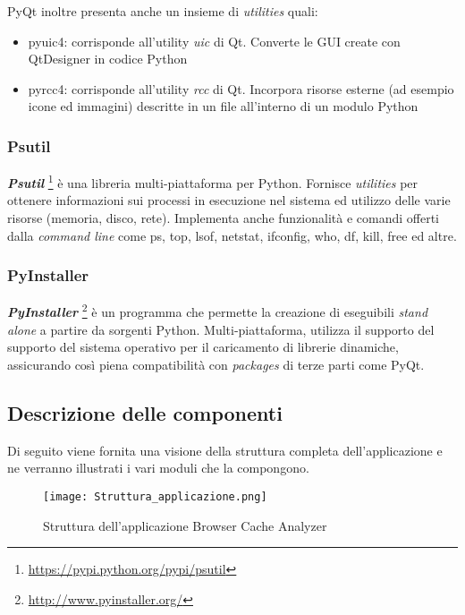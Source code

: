 PyQt inoltre presenta anche un insieme di \textit{utilities} quali:

\begin{itemize}
	\item{pyuic4: corrisponde all'utility \textit{uic} di Qt. Converte le GUI create con QtDesigner in codice Python}
	\item{pyrcc4: corrisponde all'utility \textit{rcc} di Qt. Incorpora risorse esterne (ad esempio icone ed immagini) descritte in un file all'interno di un modulo Python }
\end{itemize} 

\clearpage

\subsubsection{Psutil}
\textbf{\textit{Psutil}} \footnote{\url{https://pypi.python.org/pypi/psutil}} è una libreria multi-piattaforma per Python. Fornisce \textit{utilities} per ottenere informazioni sui processi in esecuzione nel sistema ed utilizzo delle varie risorse (memoria, disco, rete). Implementa anche funzionalità e comandi offerti dalla \textit{command line} come ps, top, lsof, netstat, ifconfig, who, df, kill, free ed altre.

\subsubsection{PyInstaller}
\textbf{\textit{PyInstaller}} \footnote{\url{http://www.pyinstaller.org/}} è un programma che permette la creazione di eseguibili \textit{stand alone} a partire da sorgenti Python. Multi-piattaforma, utilizza il supporto del supporto del sistema operativo per il caricamento di librerie dinamiche, assicurando così piena compatibilità con \textit{packages} di terze parti come PyQt.
\clearpage

\subsection{Descrizione delle componenti}
Di seguito viene fornita una visione della struttura completa dell'applicazione e ne verranno illustrati i vari moduli che la compongono.

\begin{figure}[htpb]
	\begin{center}
		\texttt{[image: Struttura\_applicazione.png]}
	\end{center}
	\caption[Struttura dell'applicazione Browser Cache Analyzer]{Struttura dell'applicazione Browser Cache Analyzer}
\end{figure}

